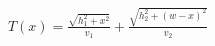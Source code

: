 \documentclass[preview]{standalone}
\begin{document}
\begin{align*}
T(x) = \frac{\sqrt{h_1^2 + x^2}}{v_1} + \frac{\sqrt{h_2^2 + (w-x)^2}}{v_2}
\end{align*}
\end{document}
